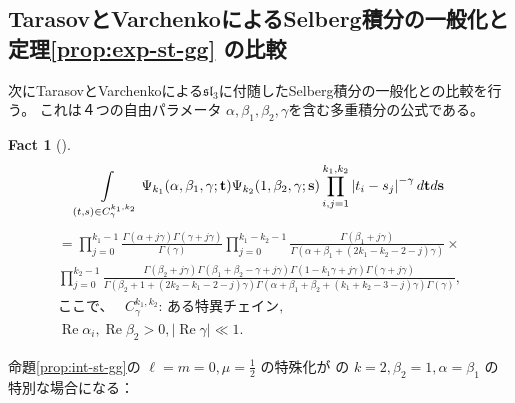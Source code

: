 \documentclass[12pt,a4paper,dvipdfmx]{jsarticle}
\numberwithin{equation}{section}
\newcommand{\myre}[1]{\tmop{Re} #1}
\newcommand{\tmop}[1]{\ensuremath{\operatorname{#1}}}
\theoremstyle{jplain}
\newtheorem{fact}[thm]{Fact}
\theoremstyle{remark}
\theoremstyle{definition}
\begin{document}
		\subsection{TarasovとVarchenkoによるSelberg積分の一般化と定理\ref{prop:exp-st-gg}
	の比較}
	次にTarasovとVarchenkoによる$\mathfrak{sl}_3$に付随したSelberg積分の一般化との比較を行う。
	これは４つの自由パラメータ
	$\alpha,\beta_1,\beta_2,\gamma$を含む多重積分の公式である。
	\newcommand{\bolds}{\mathbf{s}}
			\begin{fact}[{\cite[(3.4)]{tarasov2003selberg}}]
			{
		\begin{equation*}
			\begin{array}{c}
				\displaystyle\int_{(t,s)\in C_\gamma^{k_1,k_2}}
				\Psi_{k_1}(\alpha,\beta_1,\gamma;\boldt)\Psi_{k_2}(1,\beta_2,\gamma
				;\bolds)
				\displaystyle\prod_{i,j=1}^{k_1,k_2}\myabs{t_i-s_j}^{-\gamma}
				d\boldt d\bolds
				      \end{array}\end{equation*}
			      \begin{equation*}
			\begin{array}{c}
  =\displaystyle\prod_{j = 0}^{k_1 - 1} \frac{\Gamma (\alpha + j \gamma) \Gamma (\gamma + j
  \gamma)}{\Gamma (\gamma)} \displaystyle\prod_{j = 0}^{k_1 - k_2 - 1} \frac{\Gamma
  (\beta_1 + j \gamma)}{\Gamma (\alpha + \beta_1 + (2 k_1 - k_2 - 2 - j)
  \gamma)} \times\\
  \displaystyle\prod_{j = 0}^{k_2 - 1} \frac{\Gamma (\beta_2 + j \gamma) \Gamma (\beta_1 +
  \beta_2 - \gamma + j \gamma) \Gamma (1 - k_1 \gamma + j \gamma) \Gamma
  (\gamma + j \gamma)}{\Gamma (\beta_2 + 1 + (2 k_2 - k_1 - 2 - j) \gamma)
  \Gamma (\alpha + \beta_1 + \beta_2 + (k_1 + k_2 - 3 - j) \gamma) \Gamma
  (\gamma)},\\
			  \mbox{ここで、　 }	C^{k_1,k_2}_{\gamma}\mbox{: ある特異チェイン},\\
			  \myre{\alpha_i}, \myre{\beta_2} > 0, | \tmop{Re} \gamma | \ll 1.
			\end{array}
			\end{equation*}
				}
		\end{fact}
		命題\ref{prop:int-st-gg}の $\ell = m = 0,\mu=\frac{1}{2}$ の特殊化が
		\cite[(3.4)]{tarasov2003selberg}
の $k = 2,\beta_2=1,\alpha=\beta_1$ の特別な場合になる：\\
\end{document}
